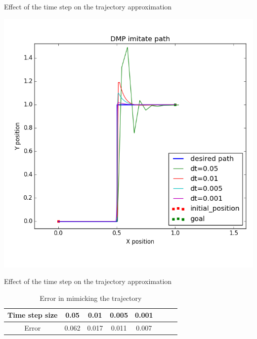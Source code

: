 \documentclass{beamer}
\begin{document}
	\begin{frame}
		Effect of the time step on the trajectory approximation
		\begin{center}
			\includegraphics[scale=0.45]{images/dt_}
		\end{center}
	\end{frame}
	
	\begin{frame}
		Effect of the time step on the trajectory approximation
		\begin{center}
			\begin{table}[H]
				\centering
				\begin{tabular}{| c | c | c | c | c | c | c | c |}	
					\hline
					Time step size & 0.05 & 0.01 & 0.005 & 0.001 \\       
					\hline
					Error & 0.062 & 0.017 & 0.011 & 0.007 \\
					\hline
				\end{tabular}
				\caption{Error in mimicking the trajectory}
			\end{table}\label{_dt_e}
		\end{center}
	\end{frame}
	
\end{document}
